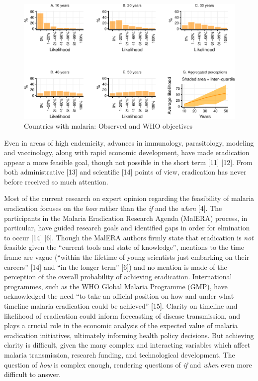 \documentclass[]{article}
\begin{document}
\begin{figure}[h]

{\centering \includegraphics{paper_files/figure-latex/unnamed-chunk-4-1} 

}

\caption{Countries with malaria: Observed and WHO objectives}\label{fig:unnamed-chunk-4}
\end{figure}

Even in areas of high endemicity, advances in immunology, parasitology,
modeling and vaccinology, along with rapid economic development, have
made eradication appear a more feasible goal, though not possible in the
short term {[}11{]} {[}12{]}. From both administrative {[}13{]} and
scientific {[}14{]} points of view, eradication has never before
received so much attention.

Most of the current research on expert opinion regarding the feasibility
of malaria eradication focuses on the \emph{how} rather than the
\emph{if} and the \emph{when} {[}4{]}. The participants in the Malaria
Eradication Research Agenda (MalERA) process, in particular, have guided
research goals and identified gaps in order for elmination to occur
{[}14{]} {[}6{]}. Though the MalERA authors firmly state that
eradication is \emph{not} feasible given the ``current tools and state
of knowledge'', mentions to the time frame are vague (``within the
lifetime of young scientists just embarking on their careers'' {[}14{]}
and ``in the longer term'' {[}6{]}) and no mention is made of the
perception of the overall probability of achieving eradication.
International programmes, such as the WHO Global Malaria Programme
(GMP), have acknowledged the need ``to take an official position on how
and under what timeline malaria eradication could be achieved''
{[}15{]}. Clarity on timeline and likelihood of eradication could inform
forecasting of disease transmission, and plays a crucial role in the
economic analysis of the expected value of malaria eradication
initiatives, ultimately informing health policy decisions. But achieving
clarity is difficult, given the many complex and interacting variables
which affect malaria transmission, research funding, and technological
development. The question of \emph{how} is complex enough, rendering
questions of \emph{if} and \emph{when} even more difficult to answer.
\end{document}
